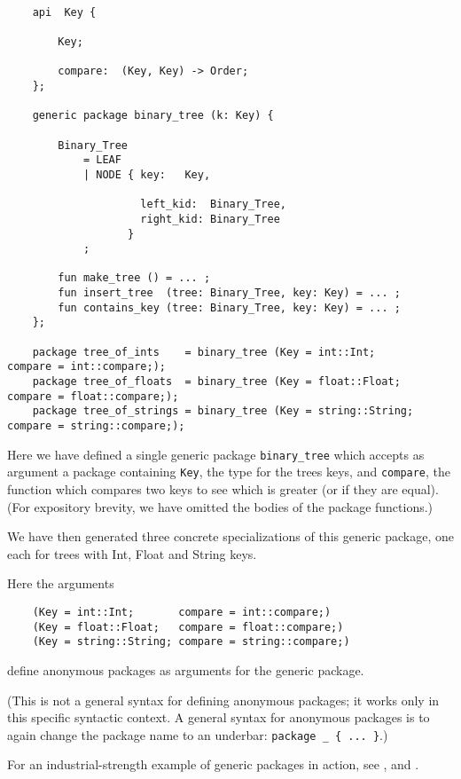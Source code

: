 \begin{verbatim}

    api  Key {

        Key;

        compare:  (Key, Key) -> Order;
    };

    generic package binary_tree (k: Key) {

        Binary_Tree
            = LEAF
            | NODE { key:   Key,

                     left_kid:  Binary_Tree,
                     right_kid: Binary_Tree
                   }
            ;

        fun make_tree () = ... ;
        fun insert_tree  (tree: Binary_Tree, key: Key) = ... ;
        fun contains_key (tree: Binary_Tree, key: Key) = ... ;
    };

    package tree_of_ints    = binary_tree (Key = int::Int;       compare = int::compare;);
    package tree_of_floats  = binary_tree (Key = float::Float;   compare = float::compare;);
    package tree_of_strings = binary_tree (Key = string::String; compare = string::compare;);
\end{verbatim}

Here we have defined a single generic package {\tt binary\_tree} which 
accepts as argument a package containing {\tt Key}, the type for the 
trees keys, and {\tt compare}, the function which compares two keys to 
see which is greater (or if they are equal).  (For expository brevity, 
we have omitted the bodies of the package functions.)

We have then generated three concrete specializations of this generic 
package, one each for trees with Int, Float and String keys.

Here the arguments

\begin{verbatim}
    (Key = int::Int;       compare = int::compare;)
    (Key = float::Float;   compare = float::compare;)
    (Key = string::String; compare = string::compare;)
\end{verbatim}

define anonymous packages as arguments for the generic package.

(This is not a general syntax for defining anonymous packages; 
it works only in this specific syntactic context.   A general 
syntax for anonymous packages is to again change the package 
name to an underbar:  {\tt package \_ \{ ... \}}.)

For an industrial-strength example of generic packages in action, see 
, 
 and 
.


\cutend*

